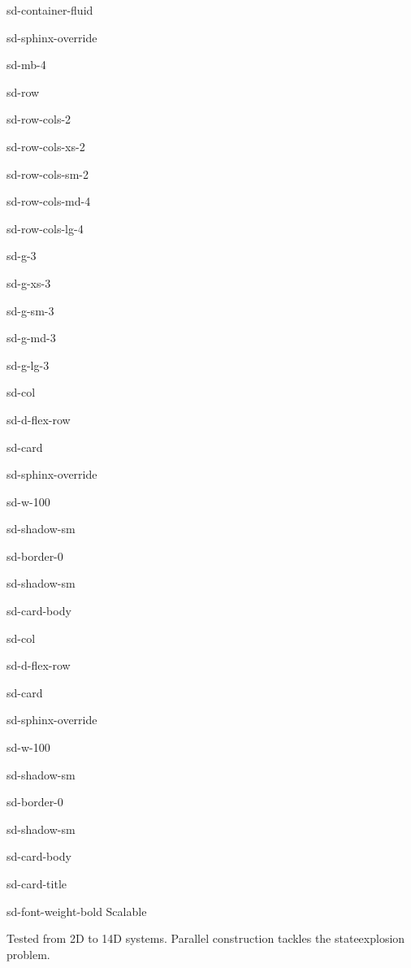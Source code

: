 \documentclass[a4paper,10pt,english]{sphinxmanual}
\begin{document}
\begin{sphinxuseclass}{sd-container-fluid}
\begin{sphinxuseclass}{sd-sphinx-override}
\begin{sphinxuseclass}{sd-mb-4}
\begin{sphinxuseclass}{sd-row}
\begin{sphinxuseclass}{sd-row-cols-2}
\begin{sphinxuseclass}{sd-row-cols-xs-2}
\begin{sphinxuseclass}{sd-row-cols-sm-2}
\begin{sphinxuseclass}{sd-row-cols-md-4}
\begin{sphinxuseclass}{sd-row-cols-lg-4}
\begin{sphinxuseclass}{sd-g-3}
\begin{sphinxuseclass}{sd-g-xs-3}
\begin{sphinxuseclass}{sd-g-sm-3}
\begin{sphinxuseclass}{sd-g-md-3}
\begin{sphinxuseclass}{sd-g-lg-3}
\begin{sphinxuseclass}{sd-col}
\begin{sphinxuseclass}{sd-d-flex-row}
\begin{sphinxuseclass}{sd-card}
\begin{sphinxuseclass}{sd-sphinx-override}
\begin{sphinxuseclass}{sd-w-100}
\begin{sphinxuseclass}{sd-shadow-sm}
\begin{sphinxuseclass}{sd-border-0}
\begin{sphinxuseclass}{sd-shadow-sm}
\begin{sphinxuseclass}{sd-card-body}
\end{sphinxuseclass}
\end{sphinxuseclass}
\end{sphinxuseclass}
\end{sphinxuseclass}
\end{sphinxuseclass}
\end{sphinxuseclass}
\end{sphinxuseclass}
\end{sphinxuseclass}
\end{sphinxuseclass}
\begin{sphinxuseclass}{sd-col}
\begin{sphinxuseclass}{sd-d-flex-row}
\begin{sphinxuseclass}{sd-card}
\begin{sphinxuseclass}{sd-sphinx-override}
\begin{sphinxuseclass}{sd-w-100}
\begin{sphinxuseclass}{sd-shadow-sm}
\begin{sphinxuseclass}{sd-border-0}
\begin{sphinxuseclass}{sd-shadow-sm}
\begin{sphinxuseclass}{sd-card-body}
\begin{sphinxuseclass}{sd-card-title}
\begin{sphinxuseclass}{sd-font-weight-bold} Scalable
\end{sphinxuseclass}
\end{sphinxuseclass}
\sphinxAtStartPar
Tested from 2D to 14D systems.
Parallel construction tackles the state\sphinxhyphen{}explosion problem.


\end{sphinxuseclass}
\end{sphinxuseclass}
\end{sphinxuseclass}
\end{sphinxuseclass}
\end{sphinxuseclass}
\end{sphinxuseclass}
\end{sphinxuseclass}
\end{sphinxuseclass}
\end{sphinxuseclass}
\end{sphinxuseclass}
\end{sphinxuseclass}
\end{sphinxuseclass}
\end{sphinxuseclass}
\end{sphinxuseclass}
\end{sphinxuseclass}
\end{sphinxuseclass}
\end{sphinxuseclass}
\end{sphinxuseclass}
\end{sphinxuseclass}
\end{sphinxuseclass}
\end{sphinxuseclass}
\end{sphinxuseclass}
\end{sphinxuseclass}
\end{document}
